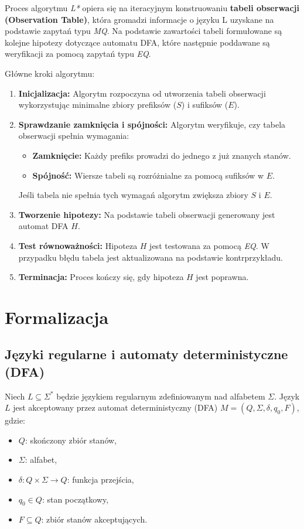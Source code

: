 Proces algorytmu \textit{L*} opiera się na iteracyjnym konstruowaniu \textbf{tabeli obserwacji (Observation Table)}, która gromadzi informacje o języku L uzyskane na podstawie zapytań typu \textit{MQ}. Na podstawie zawartości tabeli formułowane są kolejne hipotezy dotyczące automatu DFA, które następnie poddawane są weryfikacji za pomocą zapytań typu \textit{EQ}.

Główne kroki algorytmu:
\begin{enumerate}
    \item \textbf{Inicjalizacja:} Algorytm rozpoczyna od utworzenia tabeli obserwacji wykorzystując minimalne zbiory prefiksów (\( S \)) i sufiksów (\( E \)).
    \item \textbf{Sprawdzanie zamknięcia i spójności:} Algorytm weryfikuje, czy tabela obserwacji spełnia wymagania:
    \begin{itemize}
        \item \textbf{Zamknięcie:} Każdy prefiks prowadzi do jednego z już znanych stanów.
        \item \textbf{Spójność:} Wiersze tabeli są rozróżnialne za pomocą sufiksów w \( E \).
    \end{itemize}
    Jeśli tabela nie spełnia tych wymagań algorytm zwiększa zbiory \( S \) i \( E \).
    \item \textbf{Tworzenie hipotezy:} Na podstawie tabeli obserwacji generowany jest automat DFA \( H \).
    \item \textbf{Test równoważności:} Hipoteza \( H \) jest testowana za pomocą \textit{EQ}. W przypadku błędu tabela jest aktualizowana na podstawie kontrprzykładu.
    \item \textbf{Terminacja:} Proces kończy się, gdy hipoteza \( H \) jest poprawna.
\end{enumerate}

\section{Formalizacja}

\subsection{Języki regularne i automaty deterministyczne (DFA)}

Niech \( L \subseteq \Sigma^* \) będzie językiem regularnym zdefiniowanym nad alfabetem \( \Sigma \). Język \( L \) jest akceptowany przez automat deterministyczny (DFA) \( M = (Q, \Sigma, \delta, q_0, F) \), gdzie:
\begin{itemize}
    \item \( Q \): skończony zbiór stanów,
    \item \( \Sigma \): alfabet,
    \item \( \delta: Q \times \Sigma \to Q \): funkcja przejścia,
    \item \( q_0 \in Q \): stan początkowy,
    \item \( F \subseteq Q \): zbiór stanów akceptujących.
\end{itemize}


